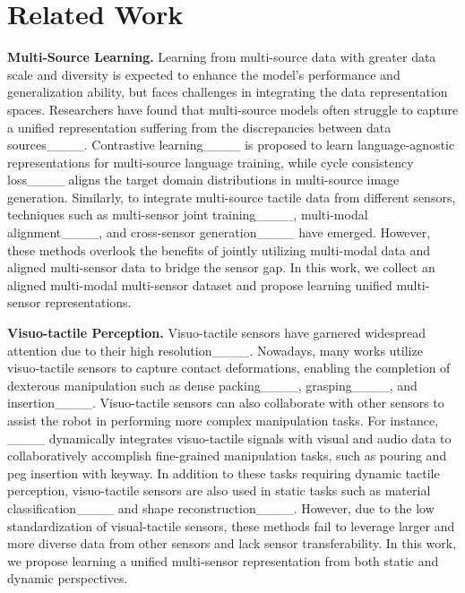 \section{Related Work}
\vspace{-4pt}

\textbf{Multi-Source Learning.}
Learning from multi-source data with greater data scale and diversity is expected to enhance the model's performance and generalization ability, but faces challenges in integrating the data representation spaces.
Researchers have found that multi-source models often struggle to capture a unified representation suffering from the discrepancies between data sources____. 
Contrastive learning____ is proposed to learn language-agnostic representations for multi-source language training, while cycle consistency loss____ aligns the target domain distributions in multi-source image generation.
Similarly, to integrate multi-source tactile data from different sensors, techniques such as multi-sensor joint training____, multi-modal alignment____, and cross-sensor generation____ have emerged. However, these methods overlook the benefits of jointly utilizing multi-modal data and aligned multi-sensor data to bridge the sensor gap. 
In this work, we collect an aligned multi-modal multi-sensor dataset and propose learning unified multi-sensor representations.

\textbf{Visuo-tactile Perception.} Visuo-tactile sensors have garnered widespread attention due to their high resolution____. Nowadays, many works utilize visuo-tactile sensors to capture contact deformations, enabling the completion of dexterous manipulation such as dense packing____, grasping____, and insertion____. Visuo-tactile sensors can also collaborate with other sensors to assist the robot in performing more complex manipulation tasks. For instance, ____ dynamically integrates visuo-tactile signals with visual and audio data to collaboratively accomplish fine-grained manipulation tasks, such as pouring and peg insertion with keyway. In addition to these tasks requiring dynamic tactile perception, visuo-tactile sensors are also used in static tasks such as material classification____ and shape reconstruction____. 
However, due to the low standardization of visual-tactile sensors, these methods fail to leverage larger and more diverse data from other sensors and lack sensor transferability. In this work, we propose learning a unified multi-sensor representation from both static and dynamic perspectives.


